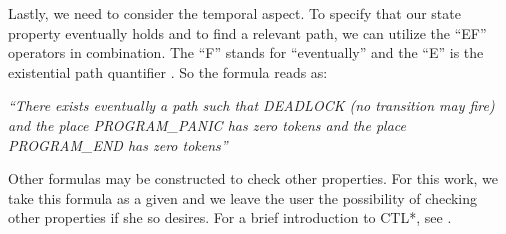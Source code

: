 Lastly, we need to consider the temporal aspect.
To specify that our state property eventually holds and to find a relevant path,
we can utilize the ``EF'' operators in combination.
The ``F'' stands for ``eventually''
and the ``E'' is the existential path quantifier \cite{meyer2020}.
So the formula reads as:

\emph{``There exists eventually a path such that DEADLOCK (no transition may fire)
  and the place PROGRAM\_PANIC has zero tokens and the place PROGRAM\_END has zero tokens''}

Other formulas may be constructed to check other properties.
For this work, we take this formula as a given and
we leave the user the possibility of checking other properties if she so desires.
For a brief introduction to \acrshort{CTL*}, see \cite{meyer2020}.